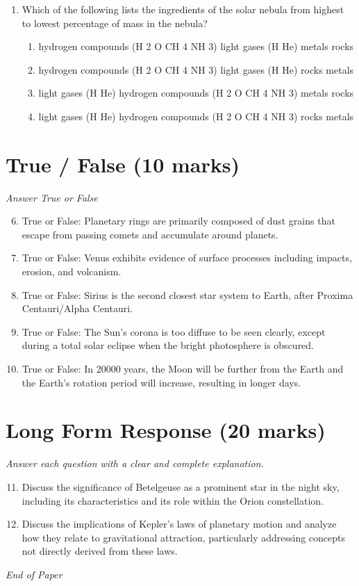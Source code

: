 \documentclass[12pt]{article}
\begin{document}
\begin{enumerate}[label=\arabic*.]
\begin{enumerate}[label=(\alph*)]
    \item It would be harder since the truck is lighter on Mars.
    \item It would be the same no matter where you are.
\end{enumerate}
\item Which of the following lists the ingredients of the solar nebula from highest to lowest percentage of mass in the nebula?
\begin{enumerate}[label=(\alph*)]
    \item hydrogen compounds (H 2 O CH 4 NH 3) light gases (H He) metals rocks
    \item hydrogen compounds (H 2 O CH 4 NH 3) light gases (H He) rocks metals
    \item light gases (H He) hydrogen compounds (H 2 O CH 4 NH 3) metals rocks
    \item light gases (H He) hydrogen compounds (H 2 O CH 4 NH 3) rocks metals
\end{enumerate}
\end{enumerate}

\section*{True / False (10 marks)}
\textit{Answer True or False}
\begin{enumerate}[label=\arabic*.]
\setcounter{enumi}{5}
\item True or False: Planetary rings are primarily composed of dust grains that escape from passing comets and accumulate around planets.
\item True or False: Venus exhibits evidence of surface processes including impacts, erosion, and volcanism.
\item True or False: Sirius is the second closest star system to Earth, after Proxima Centauri/Alpha Centauri.
\item True or False: The Sun's corona is too diffuse to be seen clearly, except during a total solar eclipse when the bright photosphere is obscured.
\item True or False: In 20000 years, the Moon will be further from the Earth and the Earth's rotation period will increase, resulting in longer days.
\end{enumerate}

\section*{Long Form Response (20 marks)}
\textit{Answer each question with a clear and complete explanation.}
\begin{enumerate}[label=\arabic*.]
\setcounter{enumi}{10}
\item Discuss the significance of Betelgeuse as a prominent star in the night sky, including its characteristics and its role within the Orion constellation.
\item Discuss the implications of Kepler's laws of planetary motion and analyze how they relate to gravitational attraction, particularly addressing concepts not directly derived from these laws.
\end{enumerate}

\vfill
\noindent\textit{End of Paper}
\end{document}
